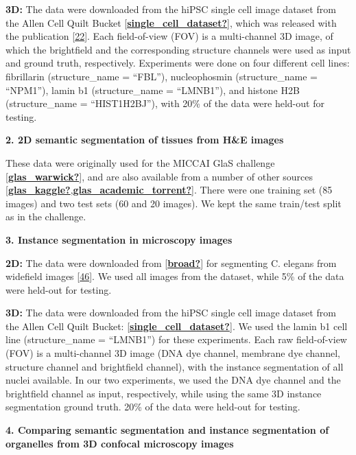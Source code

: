 \textbf{3D:} The data were downloaded from the hiPSC single cell image dataset from the Allen Cell Quilt Bucket {[}\protect\hyperlink{ref-single_cell_dataset}{\textbf{single\_cell\_dataset?}}{]}, which was released with the publication {[}\protect\hyperlink{ref-5sGcmDuy}{22}{]}. Each field-of-view (FOV) is a multi-channel 3D image, of which the brightfield and the corresponding structure channels were used as input and ground truth, respectively. Experiments were done on four different cell lines: fibrillarin (structure\_name = ``FBL''), nucleophosmin (structure\_name = ``NPM1''), lamin b1 (structure\_name = ``LMNB1''), and histone H2B (structure\_name = ``HIST1H2BJ''), with 20\% of the data were held-out for testing.

\textbf{2. 2D semantic segmentation of tissues from H\&E images}

These data were originally used for the MICCAI GlaS challenge {[}\protect\hyperlink{ref-glas_warwick}{\textbf{glas\_warwick?}}{]}, and are also available from a number of other sources {[}\protect\hyperlink{ref-glas_kaggle}{\textbf{glas\_kaggle?}},\protect\hyperlink{ref-glas_academic_torrent}{\textbf{glas\_academic\_torrent?}}{]}. There were one training set (85 images) and two test sets (60 and 20 images). We kept the same train/test split as in the challenge.

\textbf{3. Instance segmentation in microscopy images}

\textbf{2D:} The data were downloaded from {[}\protect\hyperlink{ref-broad}{\textbf{broad?}}{]} for segmenting C. elegans from widefield images {[}\protect\hyperlink{ref-wJGDcP0t}{46}{]}. We used all images from the dataset, while 5\% of the data were held-out for testing.

\textbf{3D:} The data were downloaded from the hiPSC single cell image dataset from the Allen Cell Quilt Bucket: {[}\protect\hyperlink{ref-single_cell_dataset}{\textbf{single\_cell\_dataset?}}{]}. We used the lamin b1 cell line (structure\_name = ``LMNB1'') for these experiments. Each raw field-of-view (FOV) is a multi-channel 3D image (DNA dye channel, membrane dye channel, structure channel and brightfield channel), with the instance segmentation of all nuclei available. In our two experiments, we used the DNA dye channel and the brightfield channel as input, respectively, while using the same 3D instance segmentation ground truth. 20\% of the data were held-out for testing.

\textbf{4. Comparing semantic segmentation and instance segmentation of organelles from 3D confocal microscopy images}

